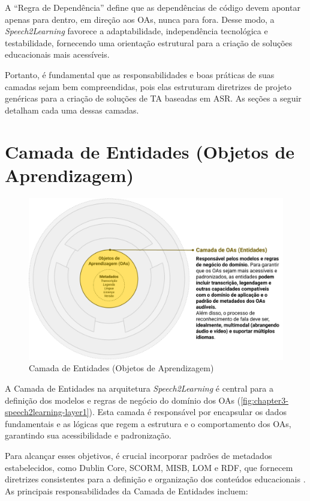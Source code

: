 A ``Regra de Dependência'' define que as dependências de código devem apontar apenas para dentro, em direção aos OAs, nunca para fora. Desse modo, a \textit{Speech2Learning} favorece a adaptabilidade, independência tecnológica e testabilidade, fornecendo uma orientação estrutural para a criação de soluções educacionais mais acessíveis. 

Portanto, é fundamental que as responsabilidades e boas práticas de suas camadas sejam bem compreendidas, pois elas estruturam diretrizes de projeto genéricas para a criação de soluções de TA baseadas em ASR. As seções a seguir detalham cada uma dessas camadas.

\section{Camada de Entidades (Objetos de Aprendizagem)}

\begin{figure}[htb]
\centering
\caption{Camada de Entidades (Objetos de Aprendizagem)}
\label{fig:chapter3-speech2learning-layer1}
\includegraphics[width=1\textwidth]{images/chapter3-speech2learning-layer1.png}
\end{figure}

A Camada de Entidades na arquitetura \textit{Speech2Learning} é central para a definição dos modelos e regras de negócio do domínio dos OAs (\autoref{fig:chapter3-speech2learning-layer1}). Esta camada é responsável por encapsular os dados fundamentais e as lógicas que regem a estrutura e o comportamento dos OAs, garantindo sua acessibilidade e padronização. 

Para alcançar esses objetivos, é crucial incorporar padrões de metadados estabelecidos, como Dublin Core, SCORM, MISB, LOM e RDF, que fornecem diretrizes consistentes para a definição e organização dos conteúdos educacionais \cite{Santana2023}. As principais responsabilidades da Camada de Entidades incluem:

